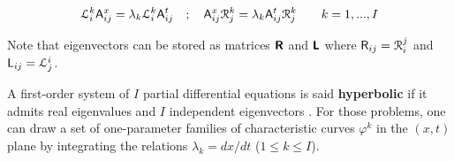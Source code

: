 \begin{equation}
  \label{eq:eigenvectors}
  \mathcal{L}^k_i  \mathsf{A}^x_{ij} = \lambda_k \mathcal{L}^k_i \mathsf{A}^t_{ij} \quad ; \quad \mathsf{A}^x_{ij}\mathcal{R}^k_j = \lambda_k \mathsf{A}^t_{ij}\mathcal{R}^k_j \qquad k=1,...,I
\end{equation}
\begin{remark}
  Note that eigenvectors can be stored as matrices $\boldsymbol{\mathsf{R}}$ and $\boldsymbol{\mathsf{L}}$ where $\mathsf{R}_{ij}=\mathcal{R}^j_i$ and $\mathsf{L}_{ij}=\mathcal{L}_j^i$.
\end{remark}

\begin{definition}
  \label{def:hyperbolic_system}
  A first-order system of $I$ partial differential equations is said \textbf{hyperbolic} if it admits real eigenvalues and $I$ independent eigenvectors \cite{Courant}.
For those problems, one can draw a set of one-parameter families of characteristic curves $\varphi^k$ in the $(x,t)$ plane by integrating the relations $\lambda_k=dx/dt$ ($1 \leq k \leq I$).
\end{definition}

